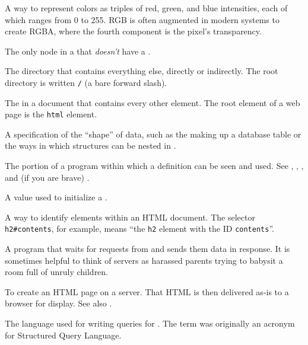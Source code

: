 \begin{description}
A way to represent colors as triples of red, green, and blue intensities, each
of which ranges from 0 to 255. RGB is often augmented in modern systems to
create RGBA, where the fourth component is the pixel's transparency.

The only node in a  that \emph{doesn't} have a .

The directory that contains everything else, directly or indirectly. The root
directory is written \texttt{/} (a bare forward slash).

The  in a document that contains every other element.
The root element of a web page is the \texttt{html} element.

A specification of the ``shape'' of data, such as the  making
up a database table or the ways in which structures can be nested in
.

The portion of a program within which a definition can be seen and used. See
, ,
, and (if you are brave)
.

A value used to initialize a .

A way to identify elements within an HTML document. The selector
\texttt{h2\#contents}, for example, means ``the \texttt{h2} element with the ID \texttt{contents}''.

A program that waits for requests from  and sends them
data in response. It is sometimes helpful to think of servers as harassed
parents trying to babysit a room full of unruly children.

To create an HTML page on a server. That HTML is then delivered as-is to a
browser for display. See also .

The language used for writing queries for . The term was originally an acronym for
Structured Query Language.


\end{description}
